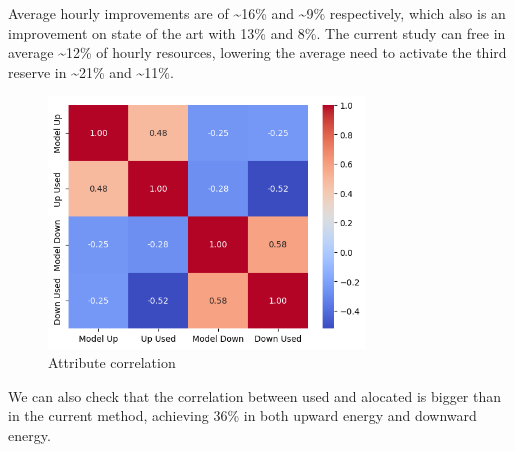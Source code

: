 Average hourly improvements are of \textasciitilde16\% and \textasciitilde9\% respectively, which also is an improvement on state of the art \cite{Algarvio2024} with 13\% and 8\%.
The current study can free in average \textasciitilde12\% of hourly resources, lowering the average need to activate the third reserve in \textasciitilde21\% and \textasciitilde11\%.\par



\begin{figure}[H]
    \centering
    \includegraphics[width=0.75\textwidth]{plots/heatmap_correlation_pred.png}
    \caption{Attribute correlation}
    \label{fig:Attribute_correlation}
  \end{figure}


We can also check that the correlation between used and alocated is bigger than in the current method, achieving 36\% in both upward energy and downward energy. \par



